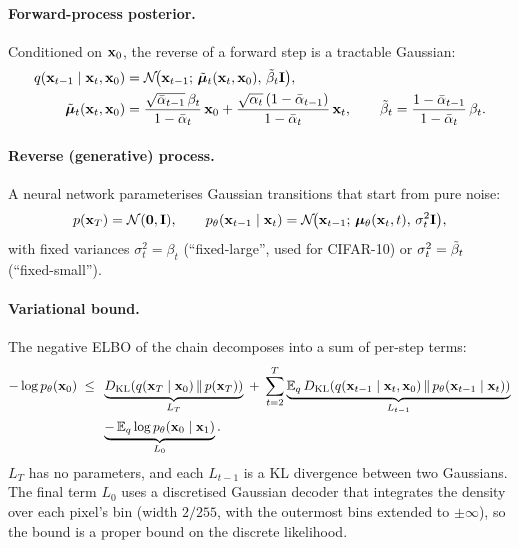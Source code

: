 \paragraph{Forward-process posterior.} Conditioned on $\mathbf{x}_0$, the reverse of a forward step is a tractable Gaussian:
\begin{align}
  q(\mathbf{x}_{t-1}\mid\mathbf{x}_t,\mathbf{x}_0) &= \mathcal{N}\!\big(\mathbf{x}_{t-1};\,\tilde{\bm{\mu}}_t(\mathbf{x}_t,\mathbf{x}_0),\,\tilde{\beta}_t\mathbf{I}\big),\\
  \tilde{\bm{\mu}}_t(\mathbf{x}_t,\mathbf{x}_0) &= \frac{\sqrt{\bar{\alpha}_{t-1}}\,\beta_t}{1-\bar{\alpha}_t}\,\mathbf{x}_0
                        + \frac{\sqrt{\alpha_t}\,(1-\bar{\alpha}_{t-1})}{1-\bar{\alpha}_t}\,\mathbf{x}_t,
  \qquad
  \tilde{\beta}_t = \frac{1-\bar{\alpha}_{t-1}}{1-\bar{\alpha}_t}\,\beta_t .
  \label{eq:posterior}
\end{align}

\paragraph{Reverse (generative) process.} A neural network parameterises Gaussian transitions that start from pure
noise:
\begin{equation}
  p(\mathbf{x}_T)=\mathcal{N}(\mathbf{0},\mathbf{I}), \qquad
  p_\theta(\mathbf{x}_{t-1}\mid\mathbf{x}_t) = \mathcal{N}\!\big(\mathbf{x}_{t-1};\,\bm{\mu}_\theta(\mathbf{x}_t,t),\,\sigma_t^2\mathbf{I}\big),
\end{equation}
with fixed variances $\sigma_t^2=\beta_t$ (``fixed-large'', used for CIFAR-10) or $\sigma_t^2=\tilde{\beta}_t$
(``fixed-small'').

\paragraph{Variational bound.} The negative ELBO of the chain decomposes into a sum of per-step terms:
\begin{equation}
\begin{split}
  -\log p_\theta(\mathbf{x}_0) \;\le\;\; &
  \underbrace{D_{\mathrm{KL}}\!\left(q(\mathbf{x}_T\mid\mathbf{x}_0)\,\middle\|\,p(\mathbf{x}_T)\right)}_{L_T}
  \;+\; \sum_{t=2}^{T}\underbrace{\mathbb{E}_q\,D_{\mathrm{KL}}\!\left(q(\mathbf{x}_{t-1}\mid\mathbf{x}_t,\mathbf{x}_0)\,\middle\|\,p_\theta(\mathbf{x}_{t-1}\mid\mathbf{x}_t)\right)}_{L_{t-1}}\\
  & \underbrace{-\,\mathbb{E}_q\log p_\theta(\mathbf{x}_0\mid\mathbf{x}_1)}_{L_0}.
\end{split}
\label{eq:vlb}
\end{equation}
$L_T$ has no parameters, and each $L_{t-1}$ is a KL divergence between two Gaussians. The final term $L_0$ uses a
discretised Gaussian decoder that integrates the density over each pixel's bin (width $2/255$, with the outermost
bins extended to $\pm\infty$), so the bound is a proper bound on the discrete likelihood.


